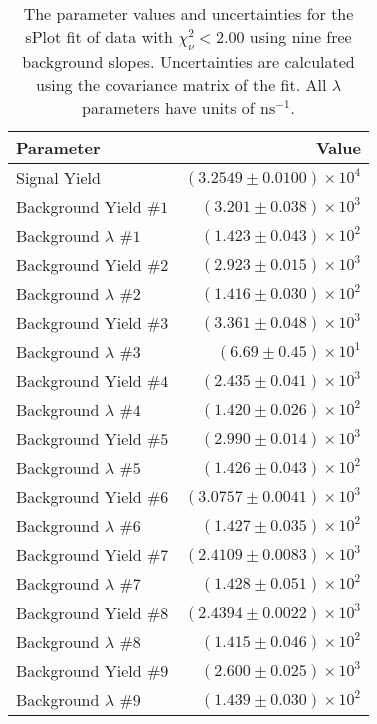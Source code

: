 
\begin{table}[ht]
    \begin{center}
        \begin{tabular}{lr}\toprule
            Parameter & Value \\\midrule
            Signal Yield & $(3.2549 \pm 0.0100) \times 10^{4}$ \\
            Background Yield $\#1$ & $(3.201 \pm 0.038) \times 10^{3}$ \\
            Background $\lambda$ $\#1$ & $(1.423 \pm 0.043) \times 10^{2}$ \\
            Background Yield $\#2$ & $(2.923 \pm 0.015) \times 10^{3}$ \\
            Background $\lambda$ $\#2$ & $(1.416 \pm 0.030) \times 10^{2}$ \\
            Background Yield $\#3$ & $(3.361 \pm 0.048) \times 10^{3}$ \\
            Background $\lambda$ $\#3$ & $(6.69 \pm 0.45) \times 10^{1}$ \\
            Background Yield $\#4$ & $(2.435 \pm 0.041) \times 10^{3}$ \\
            Background $\lambda$ $\#4$ & $(1.420 \pm 0.026) \times 10^{2}$ \\
            Background Yield $\#5$ & $(2.990 \pm 0.014) \times 10^{3}$ \\
            Background $\lambda$ $\#5$ & $(1.426 \pm 0.043) \times 10^{2}$ \\
            Background Yield $\#6$ & $(3.0757 \pm 0.0041) \times 10^{3}$ \\
            Background $\lambda$ $\#6$ & $(1.427 \pm 0.035) \times 10^{2}$ \\
            Background Yield $\#7$ & $(2.4109 \pm 0.0083) \times 10^{3}$ \\
            Background $\lambda$ $\#7$ & $(1.428 \pm 0.051) \times 10^{2}$ \\
            Background Yield $\#8$ & $(2.4394 \pm 0.0022) \times 10^{3}$ \\
            Background $\lambda$ $\#8$ & $(1.415 \pm 0.046) \times 10^{2}$ \\
            Background Yield $\#9$ & $(2.600 \pm 0.025) \times 10^{3}$ \\
            Background $\lambda$ $\#9$ & $(1.439 \pm 0.030) \times 10^{2}$ \\\bottomrule
        \end{tabular}
        \caption{The parameter values and uncertainties for the sPlot fit of data with $\chi^2_\nu < 2.00$ using nine free background slopes. Uncertainties are calculated using the covariance matrix of the fit. All $\lambda$ parameters have units of $\si{\nano\second}^{-1}$.}\label{tab:splot-fit-results-chisqdof-2.00-free-9}
    \end{center}
\end{table}

